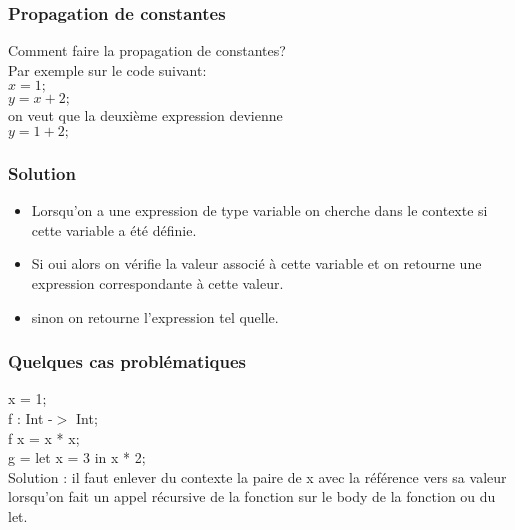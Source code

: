 \documentclass{beamer}
\begin{document}
\begin{frame}
\frametitle{Propagation de constantes}
Comment faire la propagation de constantes?\\
Par exemple sur le code suivant:\\
$x = 1;$\\
\bigskip
$y = x + 2;$\\
\bigskip
on veut que la deuxième expression devienne \\
$y = 1 + 2;$\\

\end{frame}
\begin{frame}
\frametitle{Solution}
    \begin{itemize}
        \item Lorsqu'on a une expression de type variable on cherche dans le contexte si cette variable a été définie.
        \item Si oui alors on vérifie la valeur associé à cette variable et on retourne une expression correspondante à cette valeur.
        \item sinon on retourne l'expression tel quelle.
    \end{itemize}
\end{frame}
\begin{frame}
    \frametitle{Quelques cas problématiques}
    x = 1; \\
    \bigskip
    f : Int -$>$ Int;\\
    f x = x * x;\\
    \bigskip
    g = let x = 3 in x * 2;\\
    \bigskip
    Solution : il faut enlever du contexte la paire de x avec la référence vers sa valeur lorsqu'on fait un appel récursive
    de la fonction sur le body de la fonction ou du let.
\end{frame}
\end{document}
